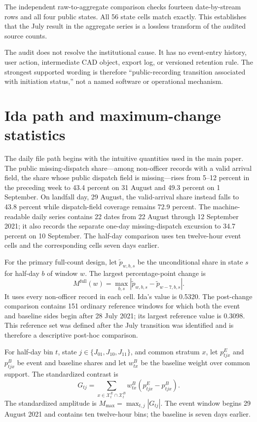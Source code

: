 \documentclass[11pt]{article}
\begin{document}
The independent raw-to-aggregate comparison checks fourteen date-by-stream rows and all four public states. All 56 state cells match exactly. This establishes that the July result in the aggregate series is a lossless transform of the audited source counts.

The audit does not resolve the institutional cause. It has no event-entry history, user action, intermediate CAD object, export log, or versioned retention rule. The strongest supported wording is therefore ``public-recording transition associated with initiation status,'' not a named software or operational mechanism.

\section{Ida path and maximum-change statistics}

The daily file path begins with the intuitive quantities used in the main paper. The public missing-dispatch share---among non-officer records with a valid arrival field, the share whose public dispatch field is missing---rises from 5--12 percent in the preceding week to 43.4 percent on 31 August and 49.3 percent on 1 September. On landfall day, 29 August, the valid-arrival share instead falls to 43.8 percent while dispatch-field coverage remains 72.9 percent. The machine-readable daily series contains 22 dates from 22 August through 12 September 2021; it also records the separate one-day missing-dispatch excursion to 34.7 percent on 10 September. The half-day comparison uses ten twelve-hour event cells and the corresponding cells seven days earlier.

For the primary full-count design, let $\widetilde p_{w,b,s}$ be the unconditional share in state $s$ for half-day $b$ of window $w$. The largest percentage-point change is
\begin{equation}
M^{\mathrm{full}}(w)=\max_{b,s}\left|\widetilde p_{w,b,s}-\widetilde p_{w-7,b,s}\right|.
\end{equation}
It uses every non-officer record in each cell. Ida's value is 0.5320. The post-change comparison contains 151 ordinary reference windows for which both the event and baseline sides begin after 28 July 2021; its largest reference value is 0.3098. This reference set was defined after the July transition was identified and is therefore a descriptive post-hoc comparison.

For half-day bin $t$, state $j\in\{J_{01},J_{10},J_{11}\}$, and common stratum $x$, let $p^E_{tjx}$ and $p^B_{tjx}$ be event and baseline shares and let $w^B_{tx}$ be the baseline weight over common support. The standardized contrast is
\begin{equation}
G_{tj}=\sum_{x\in\mathcal X_t^E\cap\mathcal X_t^B}w^B_{tx}(p^E_{tjx}-p^B_{tjx}).
\end{equation}
The standardized amplitude is $M_{\max}=\max_{t,j}|G_{tj}|$. The event window begins 29 August 2021 and contains ten twelve-hour bins; the baseline is seven days earlier.
\end{document}
